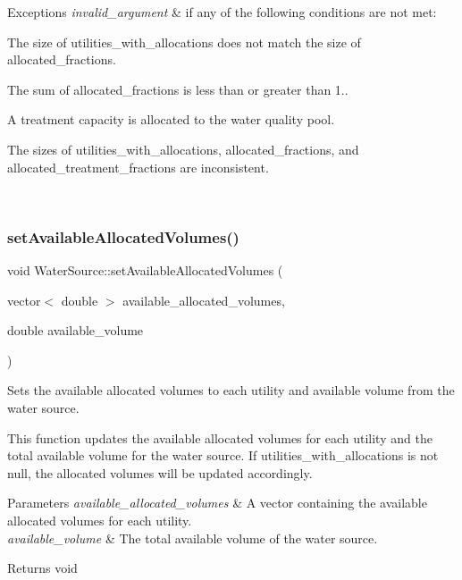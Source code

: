\begin{DoxyExceptions}{Exceptions}
{\em invalid\+\_\+argument} & if any of the following conditions are not met\+:
\begin{DoxyItemize}
\item The size of {\ttfamily utilities\+\_\+with\+\_\+allocations} does not match the size of {\ttfamily allocated\+\_\+fractions}.
\item The sum of {\ttfamily allocated\+\_\+fractions} is less than or greater than 1..
\item A treatment capacity is allocated to the water quality pool.
\item The sizes of {\ttfamily utilities\+\_\+with\+\_\+allocations}, {\ttfamily allocated\+\_\+fractions}, and {\ttfamily allocated\+\_\+treatment\+\_\+fractions} are inconsistent. 
\end{DoxyItemize}\\
\hline
\end{DoxyExceptions}
\mbox{\label{classWaterSource_ae29ed4aa2b9c97c5a41772daf4631f05}} 
\subsubsection{\texorpdfstring{set\+Available\+Allocated\+Volumes()}{setAvailableAllocatedVolumes()}}
{\footnotesize\ttfamily void Water\+Source\+::set\+Available\+Allocated\+Volumes (\begin{DoxyParamCaption}\item[{vector$<$ double $>$}]{available\+\_\+allocated\+\_\+volumes,  }\item[{double}]{available\+\_\+volume }\end{DoxyParamCaption})}



Sets the available allocated volumes to each utility and available volume from the water source. 

This function updates the available allocated volumes for each utility and the total available volume for the water source. If {\ttfamily utilities\+\_\+with\+\_\+allocations} is not null, the allocated volumes will be updated accordingly.


\begin{DoxyParams}{Parameters}
{\em available\+\_\+allocated\+\_\+volumes} & A vector containing the available allocated volumes for each utility. \\
\hline
{\em available\+\_\+volume} & The total available volume of the water source.\\
\hline
\end{DoxyParams}
\begin{DoxyReturn}{Returns}
void 
\end{DoxyReturn}
\mbox{\label{classWaterSource_a86999f23ec7f4fb518adb88e16f156a7}} 
